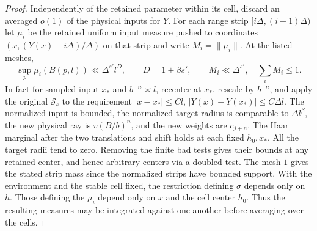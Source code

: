 \documentclass[11pt,a4paper]{article}
\begin{document}
\begin{proof}
Independently of the retained parameter within its cell, discard an
averaged $o(1)$ of the physical inputs for $Y$. For each range strip
$[i\Delta,(i+1)\Delta)$ let $\mu_i$ be the retained uniform input
measure pushed to coordinates $(x,(Y(x)-i\Delta)/\Delta)$ on that
strip and write $M_i=\|\mu_i\|$. At the listed meshes,
\[
 \sup_p\mu_i(B(p,l))\ll\Delta^{s'}l^{D},\qquad
 D=1+\beta s',\qquad M_i\ll\Delta^{s'},\quad\sum_iM_i\le1.     \tag{B4}
\]
In fact for sampled input $x_*$ and $b^{-n}\asymp l$, recenter at
$x_*$, rescale by $b^{-n}$, and apply the original $\mathcal S_s$ to
the requirement $|x-x_*|\le C l$,
$|Y(x)-Y(x_*)|\le C\Delta l$. The normalized input is bounded, the
normalized target radius is comparable to $\Delta l^\beta$, the new
physical ray is $v(B/b)^n$, and the new weights are $c_{j+n}$.
The Haar marginal after the two translations and shift holds at
each fixed $h_0,x_*$. All the target radii tend to zero. Removing
the finite bad tests gives their bounds at any retained center,
and hence arbitrary centers via a doubled test. The mesh $1$ gives
the stated strip mass since the normalized strips have bounded
support. With the environment and the stable cell fixed, the restriction
defining $\sigma$ depends only on $h$. Those defining the $\mu_i$ depend
only on $x$ and the cell center $h_0$. Thus the resulting measures may
be integrated against one another before averaging over the cells.


\end{proof}
\end{document}
